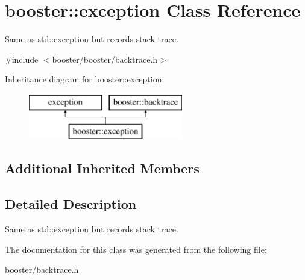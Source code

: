 \section{booster\+:\+:exception Class Reference}
\label{classbooster_1_1exception}


Same as std\+::exception but records stack trace.  




{\ttfamily \#include $<$booster/booster/backtrace.\+h$>$}

Inheritance diagram for booster\+:\+:exception\+:\begin{figure}[H]
\begin{center}
\leavevmode
\includegraphics[height=2.000000cm]{classbooster_1_1exception}
\end{center}
\end{figure}
\subsection*{Additional Inherited Members}


\subsection{Detailed Description}
Same as std\+::exception but records stack trace. 

The documentation for this class was generated from the following file\+:\begin{DoxyCompactItemize}
\item 
booster/backtrace.\+h\end{DoxyCompactItemize}
